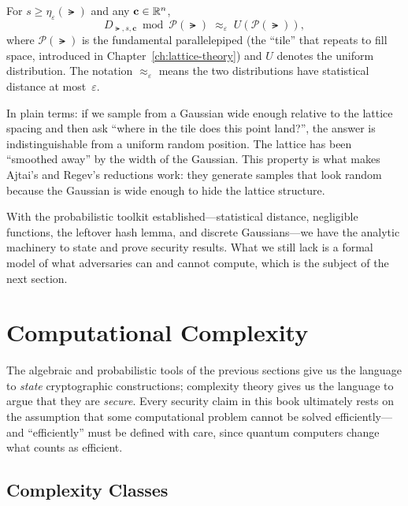 \begin{theorem}
\label{thm:smoothing}
For $s \geq \eta_\varepsilon(\lat)$ and any $\mathbf{c} \in \mathbb{R}^n$,
\begin{equation}
\label{eq:smoothing-property}
D_{\lat, s, \mathbf{c}} \bmod \mathcal{P}(\lat) \;\approx_\varepsilon\; U(\mathcal{P}(\lat)),
\end{equation}
where $\mathcal{P}(\lat)$ is the fundamental parallelepiped (the ``tile'' that repeats to fill space, introduced in Chapter~\ref{ch:lattice-theory}) and $U$ denotes the uniform distribution.  The notation $\approx_\varepsilon$ means the two distributions have statistical distance at most~$\varepsilon$.
\end{theorem}

In plain terms: if we sample from a Gaussian wide enough relative to the lattice spacing and then ask ``where in the tile does this point land?'', the answer is indistinguishable from a uniform random position.  The lattice has been ``smoothed away'' by the width of the Gaussian.  This property is what makes Ajtai's and Regev's reductions work: they generate samples that look random because the Gaussian is wide enough to hide the lattice structure.

With the probabilistic toolkit established---statistical distance, negligible functions, the leftover hash lemma, and discrete Gaussians---we have the analytic machinery to state and prove security results.  What we still lack is a formal model of what adversaries can and cannot compute, which is the subject of the next section.


\section{Computational Complexity}
\label{sec:complexity}

The algebraic and probabilistic tools of the previous sections give us the language to \emph{state} cryptographic constructions; complexity theory gives us the language to argue that they are \emph{secure}.  Every security claim in this book ultimately rests on the assumption that some computational problem cannot be solved efficiently---and ``efficiently'' must be defined with care, since quantum computers change what counts as efficient.

\subsection{Complexity Classes}
\label{subsec:complexity-classes}

